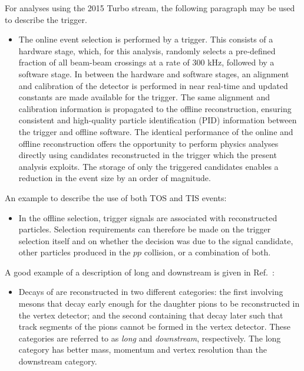 For analyses using the 2015 Turbo stream, the following paragraph may 
be used to describe the trigger.
\begin{itemize}
\item The online event selection is performed by a trigger. This consists 
      of a hardware stage, which, for this analysis, randomly selects a 
      pre-defined fraction of all beam-beam crossings at a rate of 300 kHz, 
      followed by a software stage. In between the hardware and software
      stages, an alignment and calibration of the detector is performed in 
      near real-time \cite{LHCb-PROC-2015-011} and updated constants are made
      available for the 
      trigger. The same alignment and calibration information is propagated 
      to the offline reconstruction, ensuring consistent and high-quality 
      particle identification (PID) information between the trigger and 
      offline software. The identical performance of the online and offline 
      reconstruction offers the opportunity to perform physics analyses 
      directly using candidates reconstructed in the trigger 
      \cite{LHCb-DP-2012-004,LHCb-DP-2016-001} 
      which the present analysis exploits. The storage of only the triggered
      candidates enables a reduction in the event size by an order 
      of magnitude.
\end{itemize}

An example to describe the use of both TOS and TIS events:
\begin{itemize}
\item In the offline selection, trigger signals are associated with reconstructed particles.
Selection requirements can therefore be made on the trigger selection itself
and on whether the decision was due to the signal candidate, other particles produced in the $pp$ collision, or a combination of both.
\end{itemize}

A good example of a description of long and downstream \KS is given in 
Ref.~\cite{LHCb-PAPER-2014-006}:
\begin{itemize}
\item
Decays of \decay{\KS}{\pip\pim} are reconstructed in two different categories:
the first involving \KS mesons that decay early enough for the
daughter pions to be reconstructed in the vertex detector; and the
second containing \KS that decay later such that track segments of the
pions cannot be formed in the vertex detector. These categories are
referred to as \emph{long} and \emph{downstream}, respectively. The
long category has better mass, momentum and vertex resolution than the
downstream category.
\end{itemize}

